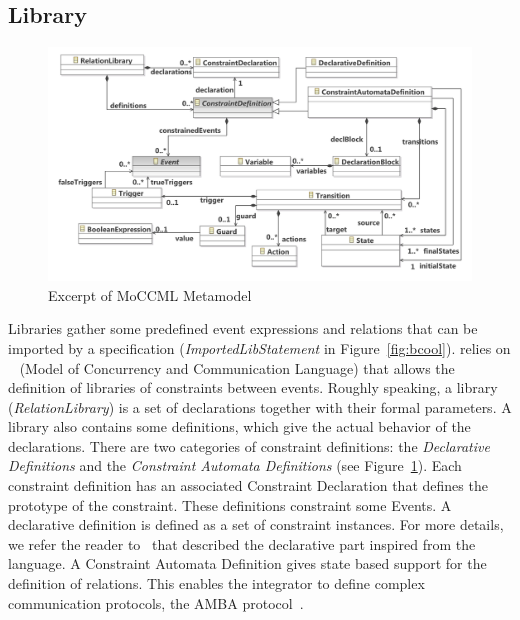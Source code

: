 \subsection{Library}
\label{subsec:bcoollib}


\begin{figure}
	\center
	\includegraphics[width=.8\textwidth]{bcool/figs/moccmlmm}
	\caption{Excerpt of MoCCML Metamodel}
	\label{fig:moccml}
\end{figure}

Libraries gather some predefined event expressions and relations that can be imported by a \bcool specification (\emph{ImportedLibStatement} in Figure~\ref{fig:bcool}). \bcool relies on \moccml~\cite{moccmlbib} (Model of Concurrency and Communication Language) that allows the definition of libraries of constraints between events. Roughly speaking, a \moccml library (\emph{RelationLibrary}) is a set of declarations together with their formal parameters. A library also contains some definitions, which give the actual behavior of the declarations. There are two categories of constraint definitions: the \emph{Declarative Definitions} and the \emph{Constraint Automata Definitions} (see Figure~\ref{fig:moccml}). Each constraint definition has an associated Constraint Declaration that defines the prototype of the constraint. These definitions constraint some Events. A declarative definition is defined as a set of constraint instances. For more details, we refer the reader to~\cite{moccmloperbib} that described the declarative part inspired from the \ccsl language. A Constraint Automata Definition gives state based support for the definition of relations. This enables the integrator to define complex communication protocols, \eg the AMBA protocol~\cite{ambabus}.

